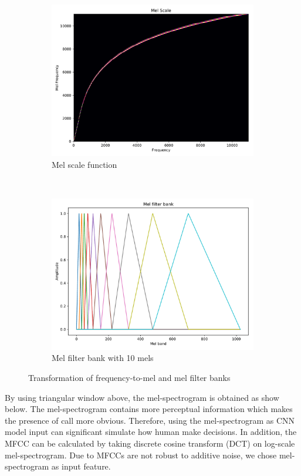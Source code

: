 \begin{figure}[htp]
     \begin{subfigure}[b]{0.5\linewidth}
         \centering
		  \includegraphics[scale=0.35]{Figs/chap3/mel_scale.pdf}
		  \caption{Mel scale function}
     \end{subfigure}
     ~
     \begin{subfigure}[b]{0.5\linewidth}
         \centering
		  \includegraphics[scale=0.35]{Figs/chap3/mel_bank.pdf}
		  \caption{Mel filter bank with 10 mels}
     \end{subfigure}
     \caption{Transformation of frequency-to-mel and mel filter banks}
     \label{fig:melscale}
\end{figure}
By using triangular window above, the mel-spectrogram is obtained as show below. The mel-spectrogram contains more perceptual information which makes the presence of call more obvious. Therefore, using the mel-spectrogram as CNN model input can significant simulate how human make decisions. In addition, the MFCC can be calculated by taking discrete cosine transform (DCT) on log-scale mel-spectrogram. Due to MFCCs are not robust to additive noise, we chose mel-spectrogram as input feature.

